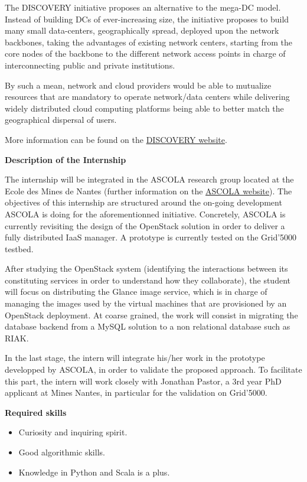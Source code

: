 \documentclass{letter}
\begin{document}
\begin{letter}
The DISCOVERY initiative proposes an alternative to the mega-DC model.
Instead of building DCs of ever-increasing size, the initiative
proposes to build many small data-centers, geographically spread,
deployed upon the network backbones, taking the advantages of existing
network centers, starting from the core nodes of the backbone to the
different network access points in charge of interconnecting public
and private institutions.

By such a mean, network and cloud providers would be able to mutualize resources
that are mandatory to operate network/data centers while delivering widely
distributed cloud computing platforms being able to better match the
geographical dispersal of users.

More information can be found on the
\href{http://beyondtheclouds.github.io}{DISCOVERY website}.


{\Large \textbf{Description of the Internship}}

The internship will be integrated in the ASCOLA research group located
at the Ecole des Mines de Nantes (further information on the
\href{http://www.emn.fr/z-info/ascola/doku.php}{ASCOLA website}).
The objectives of this internship are structured around the on-going
development ASCOLA is doing for the aforementionned initiative.
Concretely, ASCOLA is currently revisiting the design of the OpenStack
solution in order to deliver a fully distributed IaaS manager. A
prototype is currently tested on the Grid'5000 testbed.

After studying the OpenStack system (identifying the interactions between its constituting services in order to
understand how they collaborate), the student will focus on distributing the Glance
image service, which is in charge of managing the images used by the virtual
machines that are provisioned by an OpenStack deployment.
At coarse grained, the work will consist in migrating the database
backend from a MySQL solution to a non relational database such as RIAK.

 In the last stage, the intern will integrate his/her work in the
 prototype developped by ASCOLA, in order to validate the proposed
approach. To facilitate this part, the intern will work closely with Jonathan
Pastor, a 3rd year PhD applicant at Mines Nantes, in particular for the validation on Grid'5000.

{\Large \textbf{Required skills}}

\begin{itemize}
\item Curiosity and inquiring spirit.
\item Good algorithmic skills.
\item Knowledge in Python and Scala is a plus.
\end{itemize}

\end{letter}
\end{document}
